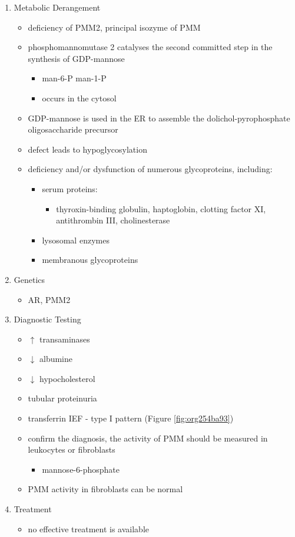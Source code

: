 \documentclass{scrartcl}
\begin{document}
\begin{enumerate}
\item Metabolic Derangement
\label{sec:orgeb2d35f}
\begin{itemize}
\item deficiency of PMM2, principal isozyme of PMM
\item phosphomannomutase 2 catalyses the second committed step in the synthesis of GDP-mannose
\begin{itemize}
\item man-6-P \ce{<=>} man-1-P
\item occurs in the cytosol
\end{itemize}
\item GDP-mannose is used in the ER to assemble the dolichol-pyrophosphate
oligosaccharide precursor
\item defect leads to hypoglycosylation
\item deficiency and/or dysfunction of numerous glycoproteins, including:
\begin{itemize}
\item serum proteins:
\begin{itemize}
\item thyroxin-binding globulin, haptoglobin, clotting factor XI,
antithrombin III, cholinesterase
\end{itemize}
\item lysosomal enzymes
\item membranous glycoproteins
\end{itemize}
\end{itemize}

\item Genetics
\label{sec:org49e1d4e}
\begin{itemize}
\item AR, PMM2
\end{itemize}

\item Diagnostic Testing
\label{sec:org0df4365}
\begin{itemize}
\item \(\uparrow\) transaminases
\item \(\downarrow\) albumine
\item \(\downarrow\) hypocholesterol
\item tubular proteinuria
\item transferrin IEF - type I pattern (Figure \ref{fig:org254ba93})
\item confirm the diagnosis, the activity of PMM should be measured in
leukocytes or fibroblasts
\begin{itemize}
\item\relax [2-H\(^{\text{3}}\)]mannose-6-phosphate
\end{itemize}
\item PMM activity in fibroblasts can be normal
\end{itemize}

\item Treatment
\label{sec:org507c4bc}
\begin{itemize}
\item no effective treatment is available
\end{itemize}
\end{enumerate}
\end{document}

